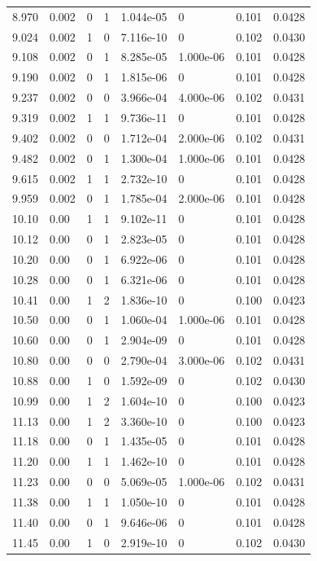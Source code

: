 \documentclass[preview]{standalone}
\begin{document}
{{{\begin{tabular}{L{1.2cm}C{1.2cm} C{0.3cm}C{0.5cm} C{1.4cm}C{1.4cm} C{1.4cm}C{1.4cm}}
  8.970  &  0.002  & 0     &  1 &  1.044e-05  & 0  & 0.101 &  0.0428   \\ 
  9.024  &  0.002  & 1     &  0 &  7.116e-10  & 0  & 0.102 &  0.0430   \\ 
  9.108  &  0.002  & 0     &  1 &  8.285e-05  & 1.000e-06  & 0.101 &  0.0428   \\ 
  9.190  &  0.002  & 0     &  1 &  1.815e-06  & 0  & 0.101 &  0.0428   \\ 
  9.237  &  0.002  & 0     &  0 &  3.966e-04  & 4.000e-06  & 0.102 &  0.0431   \\ 
  9.319  &  0.002  & 1     &  1 &  9.736e-11  & 0  & 0.101 &  0.0428   \\ 
  9.402  &  0.002  & 0     &  0 &  1.712e-04  & 2.000e-06  & 0.102 &  0.0431   \\ 
  9.482  &  0.002  & 0     &  1 &  1.300e-04  & 1.000e-06  & 0.101 &  0.0428   \\ 
  9.615  &  0.002  & 1     &  1 &  2.732e-10  & 0  & 0.101 &  0.0428   \\ 
  9.959  &  0.002  & 0     &  1 &  1.785e-04  & 2.000e-06  & 0.101 &  0.0428   \\ 
  10.10  &  0.00  & 1     &  1 &  9.102e-11  & 0  & 0.101 &  0.0428   \\ 
  10.12  &  0.00  & 0     &  1 &  2.823e-05  & 0  & 0.101 &  0.0428   \\ 
  10.20  &  0.00  & 0     &  1 &  6.922e-06  & 0  & 0.101 &  0.0428   \\ 
  10.28  &  0.00  & 0     &  1 &  6.321e-06  & 0  & 0.101 &  0.0428   \\ 
  10.41  &  0.00  & 1     &  2 &  1.836e-10  & 0  & 0.100 &  0.0423   \\ 
  10.50  &  0.00  & 0     &  1 &  1.060e-04  & 1.000e-06  & 0.101 &  0.0428   \\ 
  10.60  &  0.00  & 0     &  1 &  2.904e-09  & 0  & 0.101 &  0.0428   \\ 
  10.80  &  0.00  & 0     &  0 &  2.790e-04  & 3.000e-06  & 0.102 &  0.0431   \\ 
  10.88  &  0.00  & 1     &  0 &  1.592e-09  & 0  & 0.102 &  0.0430   \\ 
  10.99  &  0.00  & 1     &  2 &  1.604e-10  & 0  & 0.100 &  0.0423   \\ 
  11.13  &  0.00  & 1     &  2 &  3.360e-10  & 0  & 0.100 &  0.0423   \\ 
  11.18  &  0.00  & 0     &  1 &  1.435e-05  & 0  & 0.101 &  0.0428   \\ 
  11.20  &  0.00  & 1     &  1 &  1.462e-10  & 0  & 0.101 &  0.0428   \\ 
  11.23  &  0.00  & 0     &  0 &  5.069e-05  & 1.000e-06  & 0.102 &  0.0431   \\ 
  11.38  &  0.00  & 1     &  1 &  1.050e-10  & 0  & 0.101 &  0.0428   \\ 
  11.40  &  0.00  & 0     &  1 &  9.646e-06  & 0  & 0.101 &  0.0428   \\ 
  11.45  &  0.00  & 1     &  0 &  2.919e-10  & 0  & 0.102 &  0.0430   \\ 
\hline 
\end{tabular} 

}}}
\end{document}
